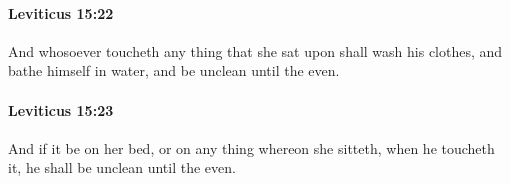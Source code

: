		\paragraph{Leviticus 15:22} %
			\label{LEVITICUS-15-22}

			And whosoever toucheth any thing that she sat upon shall wash his clothes, and bathe himself in water, and be unclean until the even.


		\paragraph{Leviticus 15:23} %
			\label{LEVITICUS-15-23}

			And if it be on her bed, or on any thing whereon she sitteth, when he toucheth it, he shall be unclean until the even.


